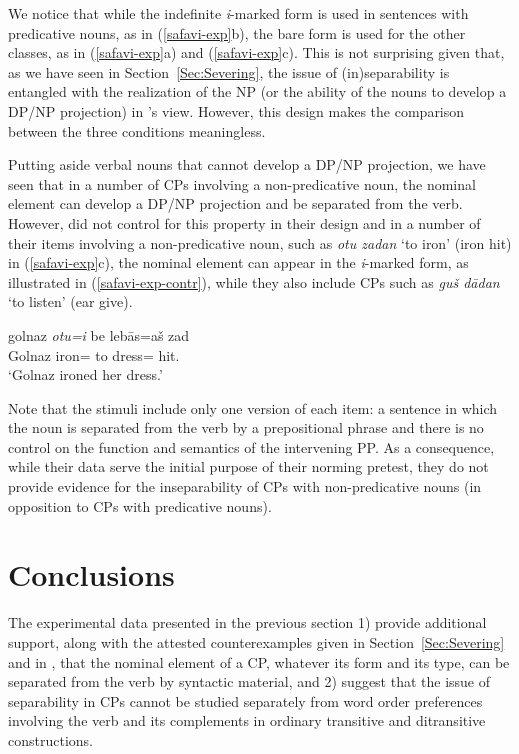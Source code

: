 \documentclass[output=paper]{langsci/langscibook}
\begin{document}
We notice that while the indefinite \textit{i}-marked form is used in sentences with predicative nouns, as in (\ref{safavi-exp}b), the bare form is used for the other classes, as in (\ref{safavi-exp}a) and (\ref{safavi-exp}c). This is not surprising given that, as we have seen in Section~\ref{Sec:Severing},  the issue of (in)separability is entangled with the realization of the NP (or the ability of the nouns to develop a DP/NP projection) in \citeauthor{Karimi-Doostan1997}'s view. However, this design makes the comparison between the three conditions meaningless. 

Putting aside verbal nouns that cannot develop a DP/NP projection, we have seen that in a number of CPs involving a non-predicative noun, the nominal element can develop a DP/NP projection and be separated from the verb. However, \citeauthor[]{SafaviEtal2016} did not control for this property in their design and in a number of their items involving a non-predicative noun, such as \textit{otu zadan} `to iron' (iron hit) in (\ref{safavi-exp}c), the nominal element can appear in the \textit{i}-marked form, as illustrated in (\ref{safavi-exp-contr}), while they also include CPs such as \textit{gu\v{s} d\=adan} `to listen' (ear give).

\begin{exe}
	\ex\label{safavi-exp-contr}
	\gll golnaz \emph{otu=i} be leb\=as=a\v{s} zad\\
	Golnaz  iron= to dress= hit.\\ 
	\glt	`Golnaz ironed her dress.'
\end{exe}

Note that the stimuli include only one version of each item: a sentence in which the noun is separated from the verb by a prepositional phrase and there is no control on the function and semantics of the intervening PP. 
As a consequence, while their data serve the initial purpose of their norming pretest, they do not provide evidence for the inseparability of CPs with non-predicative nouns (in opposition to CPs with predicative nouns).

\section{Conclusions}

\begin{sloppypar}
  The experimental data presented in the previous section 1) provide
  additional support, along with the attested counterexamples given in
  Section~\ref{Sec:Severing} and in \citet{Samvelian2012}, that the
  nominal element of a CP, whatever its form and its type, can be
  separated from the verb by syntactic material, and 2) suggest that
  the issue of separability in CPs cannot be studied separately from
  word order preferences involving the verb and its complements in
  ordinary transitive and ditransitive constructions.
\end{sloppypar}
\end{document}
